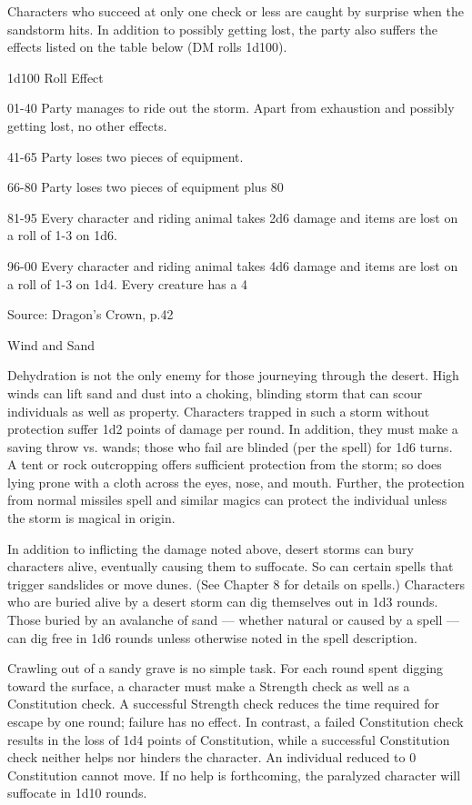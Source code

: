 Characters who succeed at only one check or less are caught by surprise when the sandstorm hits. In addition to possibly getting lost, the party also suffers the effects listed on the table below (DM rolls 1d100).

1d100 Roll Effect

01-40 Party manages to ride out the storm. Apart from exhaustion and possibly getting lost, no other effects.

41-65 Party loses two pieces of equipment.

66-80 Party loses two pieces of equipment plus 80%

81-95 Every character and riding animal takes 2d6 damage and items are lost on a roll of 1-3 on 1d6.

96-00 Every character and riding animal takes 4d6 damage and items are lost on a roll of 1-3 on 1d4. Every creature has a 4%

Source: Dragon's Crown, p.42

Wind and Sand

Dehydration is not the only enemy for those journeying through the desert. High winds can lift sand and dust into a choking, blinding storm that can scour individuals as well as property. Characters trapped in such a storm without protection suffer 1d2 points of damage per round. In addition, they must make a saving throw vs. wands; those who fail are blinded (per the spell) for 1d6 turns. A tent or rock outcropping offers sufficient protection from the storm; so does lying prone with a cloth across the eyes, nose, and mouth. Further, the protection from normal missiles spell and similar magics can protect the individual unless the storm is magical in origin.

In addition to inflicting the damage noted above, desert storms can bury characters alive, eventually causing them to suffocate. So can certain spells that trigger sandslides or move dunes. (See Chapter 8 for details on spells.) Characters who are buried alive by a desert storm can dig themselves out in 1d3 rounds. Those buried by an avalanche of sand — whether natural or caused by a spell — can dig free in 1d6 rounds unless otherwise noted in the spell description.

Crawling out of a sandy grave is no simple task. For each round spent digging toward the surface, a character must make a Strength check as well as a Constitution check. A successful Strength check reduces the time required for escape by one round; failure has no effect. In contrast, a failed Constitution check results in the loss of 1d4 points of Constitution, while a successful Constitution check neither helps nor hinders the character. An individual reduced to 0 Constitution cannot move. If no help is forthcoming, the paralyzed character will suffocate in 1d10 rounds.

